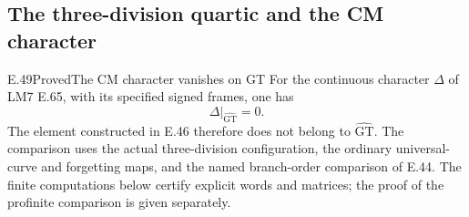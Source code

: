 \subsection{The three-division quartic and the CM character}

\begin{result}{E.49}{Proved}{The CM character vanishes on GT}
For the continuous character $\Delta$ of LM7 E.65, with its
specified signed frames, one has
\[
 \Delta|_{\widehat{\mathrm{GT}}}=0.
                                                               \tag{E.254}
\]
The element constructed in E.46 therefore does not belong to
$\widehat{\mathrm{GT}}$.
The comparison uses the actual three-division configuration,
the ordinary universal-curve and forgetting maps, and the
named branch-order comparison of E.44.  The finite computations
below certify explicit words and matrices; the proof of the
profinite comparison is given separately.
\end{result}
